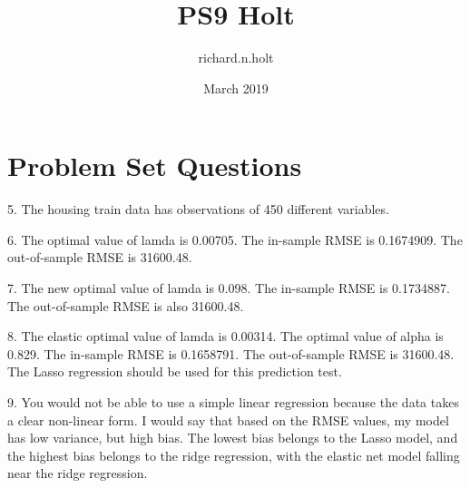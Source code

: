 \documentclass{article}
\title{PS9 Holt}
\author{richard.n.holt }
\date{March 2019}
\begin{document}
\maketitle

\section{Problem Set Questions}

5. The housing train data has observations of 450 different variables.

6. The optimal value of lamda is 0.00705. The in-sample RMSE is 0.1674909. The out-of-sample RMSE is 31600.48.

7. The new optimal value of lamda is 0.098. The in-sample RMSE is 0.1734887. The out-of-sample RMSE is also 31600.48.

8. The elastic optimal value of lamda is 0.00314. The optimal value of alpha is 0.829. The in-sample RMSE is 0.1658791. The out-of-sample RMSE is 31600.48. The Lasso regression should be used for this prediction test.

9. You would not be able to use a simple linear regression because the data takes a clear non-linear form. I would say that based on the RMSE values, my model has low variance, but high bias. The lowest bias belongs to the Lasso model, and the highest bias belongs to the ridge regression, with the elastic net model falling near the ridge regression.
\end{document}
